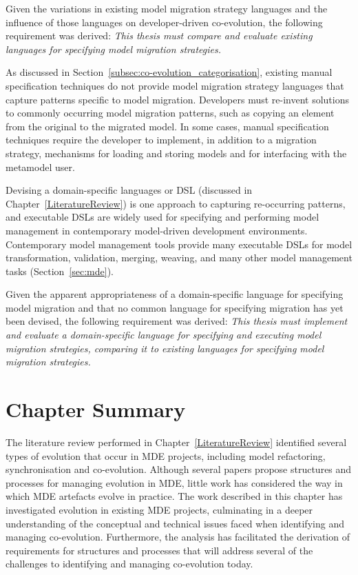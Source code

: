 Given the variations in existing model migration strategy languages and the influence of those languages on developer-driven co-evolution, the following requirement was derived: \emph{This thesis must compare and evaluate existing languages for specifying model migration strategies.}

As discussed in Section~\ref{subsec:co-evolution_categorisation}, existing manual specification techniques do not provide model migration strategy languages that capture patterns specific to model migration. Developers must re-invent solutions to commonly occurring model migration patterns, such as copying an element from the original to the migrated model. In some cases, manual specification techniques require the developer to implement, in addition to a migration strategy, mechanisms for loading and storing models and for interfacing with the metamodel user. 

Devising a domain-specific languages or DSL (discussed in Chapter~\ref{LiteratureReview}) is one approach to capturing re-occurring patterns, and executable DSLs are widely used for specifying and performing model management in contemporary model-driven development environments. Contemporary model management tools provide many executable DSLs for model transformation, validation, merging, weaving, and many other model management tasks (Section~\ref{sec:mde}).

Given the apparent appropriateness of a domain-specific language for specifying model migration and that no common language for specifying migration has yet been devised, the following requirement was derived: \emph{This thesis must implement and evaluate a domain-specific language for specifying and executing model migration strategies, comparing it to existing languages for specifying model migration strategies.}

\section{Chapter Summary}
The literature review performed in Chapter~\ref{LiteratureReview} identified several types of evolution that occur in MDE projects, including model refactoring, synchronisation and co-evolution. Although several papers propose structures and processes for managing evolution in MDE, little work has considered the way in which MDE artefacts evolve in practice. The work described in this chapter has investigated evolution in existing MDE projects, culminating in a deeper understanding of the conceptual and technical issues faced when identifying and managing co-evolution. Furthermore, the analysis has facilitated the derivation of requirements for structures and processes that will address several of the challenges to identifying and managing co-evolution today.

